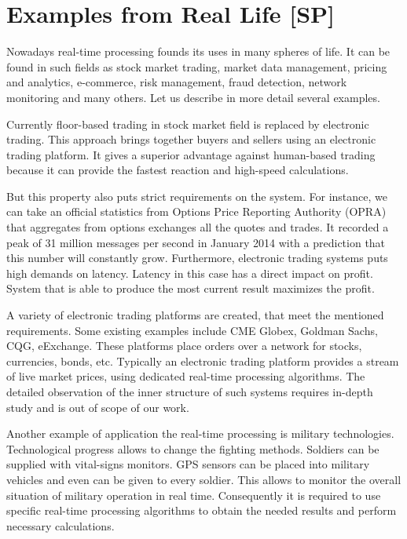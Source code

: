 \section{Examples from Real Life [SP]}

% 
% 

Nowadays real-time processing founds its uses in many spheres of life.
It can be found in such fields as stock market trading, market data management, pricing and analytics, e-commerce, risk management, fraud detection, network monitoring and many others. 
Let us describe in more detail several examples.

Currently floor-based trading in stock market field is replaced by electronic trading.
This approach brings together buyers and sellers using an electronic trading platform.
It gives a superior advantage against human-based trading because it can provide the fastest reaction and high-speed calculations.

But this property also puts strict requirements on the system.
For instance, we can take an official statistics from Options Price Reporting Authority (OPRA) that aggregates from options exchanges all the quotes and trades.   
It recorded a peak of 31 million messages per second in January 2014 with a prediction that this number will constantly grow.
Furthermore, electronic trading systems puts high demands on latency.
Latency in this case has a direct impact on profit.
System that is able to produce the most current result maximizes the profit. 

A variety of electronic trading platforms are created, that meet the mentioned requirements.
Some existing examples include CME Globex, Goldman Sachs, CQG, eExchange. 
These platforms place orders over a network for stocks, currencies, bonds, etc.
Typically an electronic trading platform provides a stream of live market prices, using dedicated real-time processing algorithms.
The detailed observation of the inner structure of such systems requires in-depth study and is out of scope of our work.

Another example of application the real-time processing is military technologies.
Technological progress allows to change the fighting methods.
Soldiers can be supplied with vital-signs monitors.
GPS sensors can be placed into military vehicles and even can be given to every soldier.
This allows to monitor the overall situation of military operation in real time.
Consequently it is required to use specific real-time processing algorithms to obtain the needed results and perform necessary calculations.

